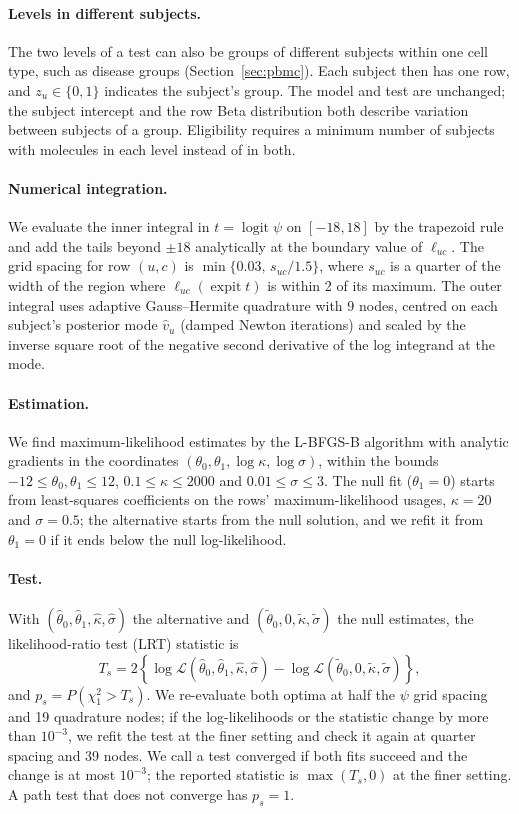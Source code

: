 \documentclass[11pt]{article}
\newcommand{\expit}{\operatorname{expit}}
\newcommand{\logit}{\operatorname{logit}}
\begin{document}
\paragraph{Levels in different subjects.} The two levels of a test can also be groups of different subjects within one cell type, such as disease groups (Section~\ref{sec:pbmc}). Each subject then has one row, and $z_u\in\{0,1\}$ indicates the subject's group. The model and test are unchanged; the subject intercept and the row Beta distribution both describe variation between subjects of a group. Eligibility requires a minimum number of subjects with molecules in each level instead of in both.

\paragraph{Numerical integration.} We evaluate the inner integral in $t=\logit\psi$ on $[-18,18]$ by the trapezoid rule and add the tails beyond $\pm18$ analytically at the boundary value of $\ell_{uc}$. The grid spacing for row $(u,c)$ is $\min\{0.03,\,s_{uc}/1.5\}$, where $s_{uc}$ is a quarter of the width of the region where $\ell_{uc}(\expit t)$ is within 2 of its maximum. The outer integral uses adaptive Gauss--Hermite quadrature with 9 nodes, centred on each subject's posterior mode $\widehat v_u$ (damped Newton iterations) and scaled by the inverse square root of the negative second derivative of the log integrand at the mode.

\paragraph{Estimation.} We find maximum-likelihood estimates by the L-BFGS-B algorithm with analytic gradients in the coordinates $(\theta_0,\theta_1,\log\kappa,\log\sigma)$, within the bounds $-12\le\theta_0,\theta_1\le12$, $0.1\le\kappa\le2000$ and $0.01\le\sigma\le3$. The null fit ($\theta_1=0$) starts from least-squares coefficients on the rows' maximum-likelihood usages, $\kappa=20$ and $\sigma=0.5$; the alternative starts from the null solution, and we refit it from $\theta_1=0$ if it ends below the null log-likelihood.

\paragraph{Test.} With $(\widehat\theta_0,\widehat\theta_1,\widehat\kappa,\widehat\sigma)$ the alternative and $(\widetilde\theta_0,0,\widetilde\kappa,\widetilde\sigma)$ the null estimates, the likelihood-ratio test (LRT) statistic is \[T_s=2\left\{\log\mathcal L(\widehat\theta_0,\widehat\theta_1,\widehat\kappa,\widehat\sigma)-\log\mathcal L(\widetilde\theta_0,0,\widetilde\kappa,\widetilde\sigma)\right\},\] and $p_s=P(\chi^2_1>T_s)$. We re-evaluate both optima at half the $\psi$ grid spacing and 19 quadrature nodes; if the log-likelihoods or the statistic change by more than $10^{-3}$, we refit the test at the finer setting and check it again at quarter spacing and 39 nodes. We call a test converged if both fits succeed and the change is at most $10^{-3}$; the reported statistic is $\max(T_s,0)$ at the finer setting. A path test that does not converge has $p_s=1$.
\end{document}
